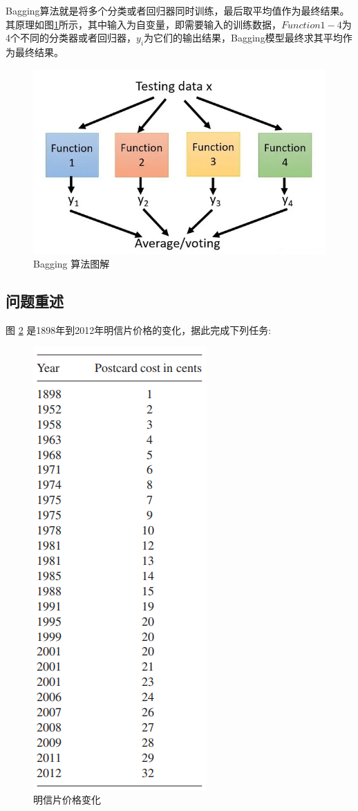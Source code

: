Bagging算法就是将多个分类或者回归器同时训练，最后取平均值作为最终结果。其原理如图\ref{7}所示，其中输入为自变量，即需要输入的训练数据，$Function 1-4$为4个不同的分类器或者回归器，$y_i$为它们的输出结果，Bagging模型最终求其平均作为最终结果。

\begin{figure}[h]
	\centering
	\includegraphics[scale=0.5,angle=0]{images/7.png}
	\caption{Bagging 算法图解}
	\label{7}
\end{figure}

\subsection{问题重述}
图 \ref{8} 是1898年到2012年明信片价格的变化，据此完成下列任务:
\begin{figure}[h]
	\centering
	\includegraphics[scale=0.6,angle=0]{images/8.png}
	\caption{明信片价格变化}
	\label{8}
\end{figure}

